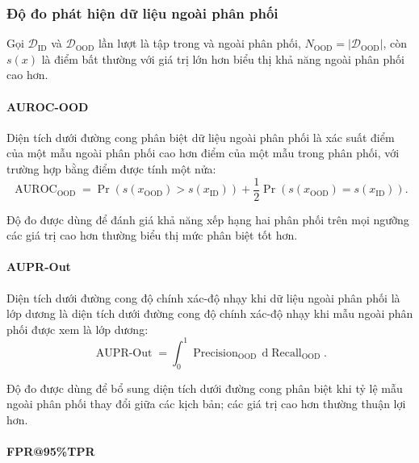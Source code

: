 \subsubsection{Độ đo phát hiện dữ liệu ngoài phân phối}

Gọi $\mathcal{D}_{\mathrm{ID}}$ và $\mathcal{D}_{\mathrm{OOD}}$ lần lượt là tập trong và ngoài phân phối, $N_{\mathrm{OOD}}=|\mathcal{D}_{\mathrm{OOD}}|$, còn $s(x)$ là điểm bất thường với giá trị lớn hơn biểu thị khả năng ngoài phân phối cao hơn.

\paragraph{AUROC-OOD}

Diện tích dưới đường cong phân biệt dữ liệu ngoài phân phối \cite{Hendrycks2017MSP} là xác suất điểm của một mẫu ngoài phân phối cao hơn điểm của một mẫu trong phân phối, với trường hợp bằng điểm được tính một nửa:
\begin{equation}
\operatorname{AUROC}_{\mathrm{OOD}}
=\Pr\!\left(s(x_{\mathrm{OOD}})>s(x_{\mathrm{ID}})\right)
+\frac{1}{2}\Pr\!\left(s(x_{\mathrm{OOD}})=s(x_{\mathrm{ID}})\right).
\label{eq:ch4_auroc_ood}
\end{equation}

Độ đo được dùng để đánh giá khả năng xếp hạng hai phân phối trên mọi ngưỡng các giá trị cao hơn thường biểu thị mức phân biệt tốt hơn.

\paragraph{AUPR-Out}

Diện tích dưới đường cong độ chính xác-độ nhạy khi dữ liệu ngoài phân phối là lớp dương \cite{Hendrycks2017MSP,Liang2018ODIN} là diện tích dưới đường cong độ chính xác-độ nhạy khi mẫu ngoài phân phối được xem là lớp dương:
\begin{equation}
\operatorname{AUPR\text{-}Out}
=\int_{0}^{1}\operatorname{Precision}_{\mathrm{OOD}}\,
\mathrm{d}\operatorname{Recall}_{\mathrm{OOD}}.
\label{eq:ch4_aupr_out}
\end{equation}

Độ đo được dùng để bổ sung diện tích dưới đường cong phân biệt khi tỷ lệ mẫu ngoài phân phối thay đổi giữa các kịch bản; các giá trị cao hơn thường thuận lợi hơn.

\paragraph{FPR@95\%TPR}

